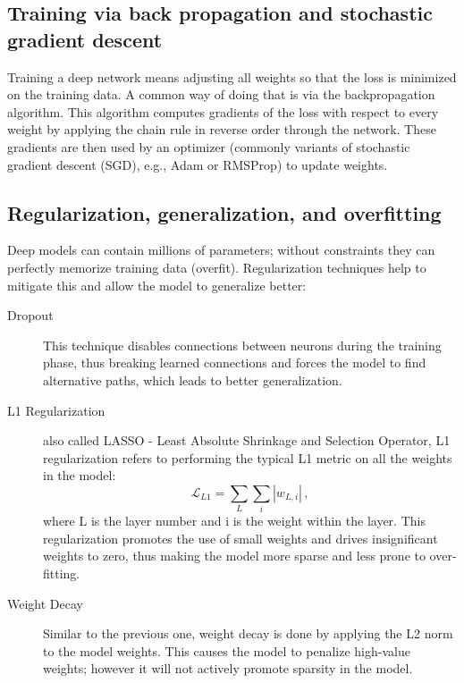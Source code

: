 \subsection{Training via back propagation and stochastic gradient descent}

Training a deep network means adjusting all weights so that the loss is minimized on the training data. A common way of doing that is via the backpropagation algorithm. This algorithm computes gradients of the loss with respect to every weight by applying the chain rule in reverse order through the network. These gradients are then used by an optimizer (commonly variants of stochastic gradient descent (SGD), e.g., Adam or RMSProp) to update weights.

\subsection{Regularization, generalization, and overfitting}
Deep models can contain millions of parameters; without constraints they can perfectly memorize training data (overfit). Regularization techniques help to mitigate this and allow the model to generalize better:

\begin{description}
    \item [Dropout] This technique disables connections between neurons during the training phase, thus breaking learned connections and forces the model to find alternative paths, which leads to better generalization.
    \item [L1 Regularization] also called LASSO - Least Absolute Shrinkage and Selection Operator, L1 regularization refers to performing the typical L1 metric on all the weights in the model:
    \begin{equation}
    	\mathcal{L}_{L1} = \sum_L\sum_i|w_{L,i}|\,, 
    \end{equation}
     where L is the layer number and i is the weight within the layer. This regularization promotes the use of small weights and drives insignificant weights to zero, thus making the model more sparse and less prone to over-fitting.
    \item [Weight Decay] Similar to the previous one, weight decay is done by applying the L2 norm to the model weights. This causes the model to penalize high-value weights; however it will not actively promote sparsity in the model.
\end{description}

